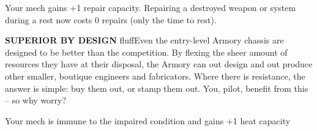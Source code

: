 Your mech gains +1 repair capacity. Repairing a destroyed weapon or system during a rest now costs 0 repairs (only the time to rest).


\textbf{SUPERIOR BY DESIGN}\newline
fluff{Even the entry-level Armory chassis are designed to be better than the competition. By flexing the sheer amount of resources they have at their disposal, the Armory can out design and out produce other smaller, boutique engineers and fabricators. Where there is resistance, the answer is simple: buy them out, or stamp them out. You, pilot, benefit from this -- so why worry?}

Your mech is immune to the impaired condition and gains +1 heat capacity
